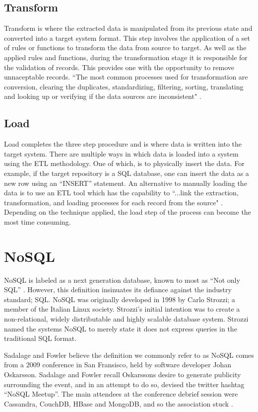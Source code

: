 \subsection{Transform}
Transform is where the extracted data is manipulated from its previous state and converted into a target system format. This step involves the application of a set of rules or functions to transform the data from source to target. As well as the applied rules and functions, during the transformation stage it is responsible for the validation of records. This provides one with the opportunity to remove unnaceptable records. ``The most common processes used for transformation are conversion, clearing the duplicates, standardizing, filtering, sorting, translating and looking up or verifying if the data sources are inconsistent" \cite{etlref2}.

\subsection{Load}
Load completes the three step procedure and is where data is written into the target system. There are multiple ways in which data is loaded into a system using the ETL methodology. One of which, is to physically insert the data. For example, if the target repository is a SQL database, one can insert the data as a new row using an ``INSERT'' statement. An alternative to manually loading the data is to use an ETL tool which has the capability to ``...link the extraction, transformation, and loading processes for each record from the source" \cite{etlref2}. Depending on the technique applied, the load step of the process can become the most time consuming.

\section{NoSQL}\label{nosql}
NoSQL is labeled as a next generation database, known to most as ``Not only SQL'' \cite{nosql1}. However, this definition insinuates its defiance against the industry standard; SQL. NoSQL was originally developed in 1998 by Carlo Strozzi; a member of the Italian Linux society. Strozzi's initial intention was to create a non-relational, widely distributable and highly scalable database system. Strozzi named the systems NoSQL to merely state it does not express queries in the traditional SQL format.

Sadalage and Fowler believe the definition we commonly refer to as NoSQL comes from a 2009 conference in San Fransisco, held by software developer Johan Oskarsson. Sadalage and Fowler recall Oskarssons desire to generate publicity surrounding the event, and in an attempt to do so, devised the twitter hashtag ``NoSQL Meetup''. The main attendees at the conference debrief session were Cassandra, CouchDB, HBase and MongoDB, and so the association stuck \cite{nosql1}.

